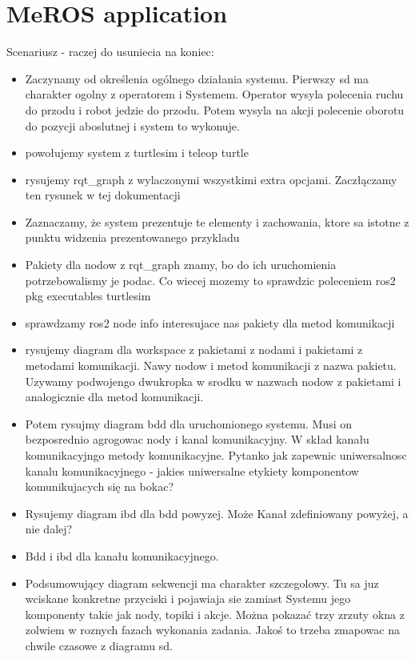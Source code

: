 \documentclass[11pt,oneside,a4paper]{report}
\begin{document}
\chapter{MeROS application}
\label{ch:application}
Scenariusz - raczej do usuniecia na koniec:
\begin{itemize}
	\item Zaczynamy od określenia ogólnego działania systemu. Pierwszy sd ma charakter ogolny z operatorem i Systemem. Operator wysyla polecenia ruchu do przodu i robot jedzie do przodu. Potem wysyla na akcji polecenie oborotu do pozycji aboslutnej i system to wykonuje.
	\item powołujemy system z turtlesim i teleop turtle
	\item rysujemy rqt\_graph z wylaczonymi wszystkimi extra opcjami. Zaczłączamy ten rysunek w tej dokumentacji
	\item Zaznaczamy, że system prezentuje te elementy i zachowania, ktore sa istotne z punktu widzenia prezentowanego przykladu
	\item Pakiety dla nodow z rqt\_graph  znamy, bo do ich uruchomienia potrzebowalismy je podac. Co wiecej mozemy to sprawdzic poleceniem ros2 pkg executables turtlesim
	\item sprawdzamy ros2 node info interesujace nas pakiety dla metod komunikacji
	\item rysujemy diagram dla workspace z pakietami z nodami i pakietami z metodami komunikacji. Nawy nodow i metod komunikacji z nazwa pakietu. Uzywamy podwojengo dwukropka w srodku w nazwach nodow z pakietami i analogicznie dla metod komunikacji.
	\item Potem rysujmy diagram bdd dla uruchomionego systemu. Musi on bezposrednio agrogowac nody i kanal komunikacyjny. W skład kanału komunikacyjngo metody komunikacyjne. Pytanko jak zapewnic uniwersalnosc kanalu komunikacyjnego - jakies uniwersalne etykiety komponentow komunikujacych się na bokac?
	\item Rysujemy diagram ibd dla bdd powyzej. Może Kanał zdefiniowany powyżej, a nie dalej?
	\item Bdd i ibd dla kanału komunikacyjnego.
	\item Podsumowujący diagram sekwencji ma charakter szczegolowy. Tu sa juz wciskane konkretne przyciski i pojawiaja sie zamiast Systemu jego komponenty takie jak nody, topiki i akcje. Można pokazać trzy zrzuty okna z zolwiem w roznych fazach wykonania zadania. Jakoś to trzeba zmapowac na chwile czasowe z diagramu sd.
\end{itemize}
\end{document}
